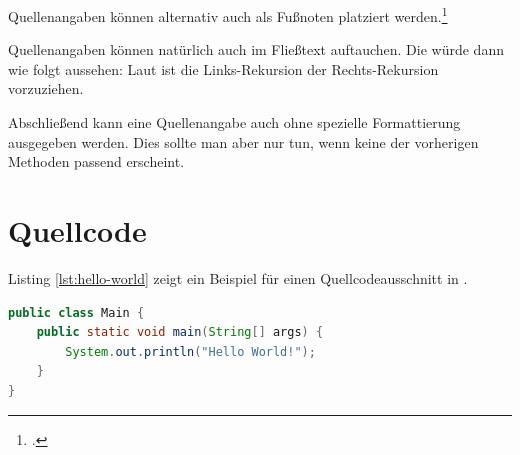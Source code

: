 Quellenangaben können alternativ auch als Fußnoten platziert werden.\footcite[7-14]{angenendt}

Quellenangaben können natürlich auch im Fließtext auftauchen. Die würde dann wie folgt aussehen: Laut \textcite[51]{angenendt} ist die Links-Rekursion der Rechts-Rekursion vorzuziehen.

Abschließend kann eine Quellenangabe auch ohne spezielle Formattierung ausgegeben werden. Dies sollte man aber nur tun, wenn keine der vorherigen Methoden passend erscheint. \cite[100-101]{angenendt}




\section{Quellcode}

Listing \vref{lst:hello-world} zeigt ein Beispiel für einen Quellcodeausschnitt in \latex.

\begin{lstlisting}[language=Java, caption={Hello World in Java}, label=lst:hello-world]
public class Main {
	public static void main(String[] args) {
		System.out.println("Hello World!");
	}
}
\end{lstlisting}
